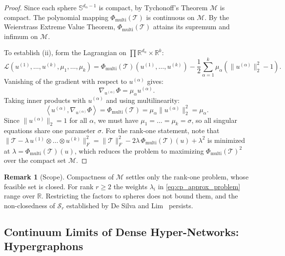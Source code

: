 \documentclass[11pt,a4paper,reqno]{amsart}
\theoremstyle{definition}
\newtheorem{remark}[theorem]{Remark}
\numberwithin{equation}{section}
\providecommand{\R}{\mathbb{R}}
\providecommand{\Sph}{\mathbb{S}}
\newcommand{\inner}[2]{\left\langle #1, #2 \right\rangle}
\begin{document}
\begin{proof}
Since each sphere $\Sph^{d_\alpha - 1}$ is compact, by Tychonoff's Theorem $\mathcal{M}$ is compact. The polynomial mapping $\Phi_{\mathrm{multi}}(\mathcal{T})$ is continuous on $\mathcal{M}$. By the Weierstrass Extreme Value Theorem, $\Phi_{\mathrm{multi}}(\mathcal{T})$ attains its supremum and infimum on $\mathcal{M}$. 

To establish (ii), form the Lagrangian on $\prod \R^{d_\alpha} \times \R^k$:
\begin{equation}
    \mathcal{L}(u^{(1)}, \dots, u^{(k)}, \mu_1, \dots, \mu_k) = \Phi_{\mathrm{multi}}(\mathcal{T})(u^{(1)}, \dots, u^{(k)}) - \frac{1}{2} \sum_{\alpha=1}^k \mu_\alpha (\|u^{(\alpha)}\|_2^2 - 1).
\end{equation}
Vanishing of the gradient with respect to $u^{(\alpha)}$ gives:
\begin{equation}
    \nabla_{u^{(\alpha)}} \Phi = \mu_\alpha u^{(\alpha)}.
\end{equation}
Taking inner products with $u^{(\alpha)}$ and using multilinearity:
\begin{equation}
    \inner{u^{(\alpha)}}{\nabla_{u^{(\alpha)}} \Phi} = \Phi_{\mathrm{multi}}(\mathcal{T}) = \mu_\alpha \|u^{(\alpha)}\|_2^2 = \mu_\alpha.
\end{equation}
Since $\|u^{(\alpha)}\|_2 = 1$ for all $\alpha$, we must have $\mu_1 = \dots = \mu_k = \sigma$, so all singular equations share one parameter $\sigma$. For the rank-one statement, note that $\|\mathcal{T} - \lambda\, u^{(1)}\otimes\dots\otimes u^{(k)}\|_F^2 = \|\mathcal{T}\|_F^2 - 2\lambda\,\Phi_{\mathrm{multi}}(\mathcal{T})(u) + \lambda^2$ is minimized at $\lambda = \Phi_{\mathrm{multi}}(\mathcal{T})(u)$, which reduces the problem to maximizing $\Phi_{\mathrm{multi}}(\mathcal{T})^2$ over the compact set $\mathcal{M}$.
\end{proof}

\begin{remark}[Scope]
Compactness of $\mathcal{M}$ settles only the rank-one problem, whose feasible set is closed. For rank $r \ge 2$ the weights $\lambda_i$ in \eqref{eq:cp_approx_problem} range over $\R$. Restricting the factors to spheres does not bound them, and the non-closedness of $\mathcal{S}_r$ established by De Silva and Lim~\cite{desilva2008illposed} persists.
\end{remark}

\subsection{Continuum Limits of Dense Hyper-Networks: Hypergraphons}
\label{subsec:hypergraphons}
\end{document}
